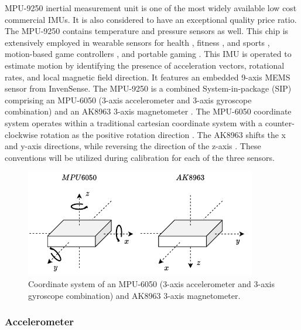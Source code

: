 MPU-9250 inertial measurement unit is one of the most widely available low cost commercial IMUs. It is also considered to have an exceptional quality price ratio. The MPU-9250 contains temperature and pressure sensors as well. This chip is extensively employed in wearable sensors for health \cite{majumder2017wearable} \cite{al2019remote}, fitness \cite{altini2016cardiorespiratory}, and sports \cite{rum2021wearable} \cite{morris2008wearable} \cite{ermes2008detection}, motion-based game controllers \cite{heinz2006using}, and portable gaming \cite{mortazavi2013near} \cite{cao2019wearable}. This IMU is operated to estimate motion by identifying the presence of acceleration vectors, rotational rates, and local magnetic field direction. It features an embedded 9-axis MEMS sensor from InvenSense. The MPU-9250 is a combined System-in-package (SIP) comprising an MPU-6050 (3-axis accelerometer and 3-axis gyroscope combination) and an AK8963 3-axis magnetometer \cite{mpu9250}. The MPU-6050 coordinate system operates within a traditional cartesian coordinate system with a counter-clockwise rotation as the positive rotation direction \cite{mpu6050}. The AK8963 shifts the x and y-axis directions, while reversing the direction of the z-axis \cite{ak8963c}. These conventions will be utilized during calibration for each of the three sensors.

\begin{figure}[!h]
  \centering
  \includegraphics[width=0.9\textwidth]{figures/mpu_orientation.pdf}
  \caption{ Coordinate system of an MPU-6050 (3-axis accelerometer and 3-axis gyroscope combination) and AK8963 3-axis magnetometer. \cite{mpu6050} \cite{ak8963c} }
  \label{fig:mpu_orientation}
\end{figure}

\subsubsection{Accelerometer}

